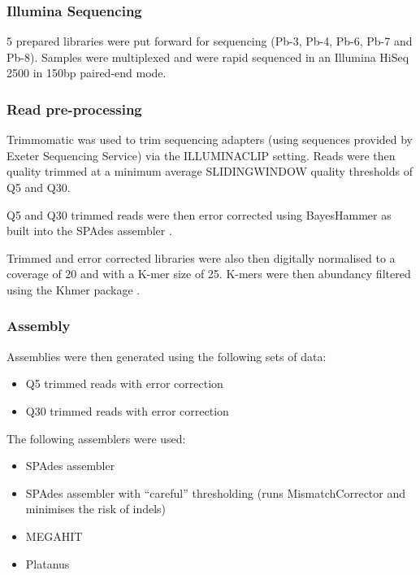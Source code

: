 \subsubsection{Illumina Sequencing}

5 prepared libraries were put forward for sequencing 
(Pb-3, Pb-4, Pb-6, Pb-7 and Pb-8).   Samples were
multiplexed and were rapid sequenced in an Illumina
HiSeq 2500 in 150bp paired-end mode. 

\subsubsection{Read pre-processing}

Trimmomatic \citep{Bolger2014a} was used to trim sequencing adapters (using sequences
provided by Exeter Sequencing Service) via the ILLUMINACLIP setting.
Reads were then quality trimmed at a minimum average SLIDINGWINDOW 
quality thresholds of Q5 and Q30. 

Q5 and Q30 trimmed reads were then error corrected using BayesHammer
\citep{Nikolenko2013} as built into the SPAdes assembler \citep{Bankevich2012}.

Trimmed and error corrected libraries were also then digitally normalised
\citep{Brown2012} to a coverage of 20 and with a K-mer size of 25.
K-mers were then abundancy filtered \citep{Zhang2014,Zhang2015}
using the Khmer package \citep{Crusoe2015}.

\subsubsection{Assembly}

Assemblies were then generated using the following sets
of data:

\begin{itemize}
    \item Q5 trimmed reads with error correction
    \item Q30 trimmed reads with error correction
\end{itemize}

The following assemblers were used:
\begin{itemize}
    \item SPAdes assembler \citep{Bankevich2012,Nurk2013}
    \item SPAdes assembler with ``careful'' thresholding (runs MismatchCorrector and minimises the risk 
        of indels)
    \item MEGAHIT \citep{Li2015a}
    \item Platanus \citep{Kajitani2014}
\end{itemize}

